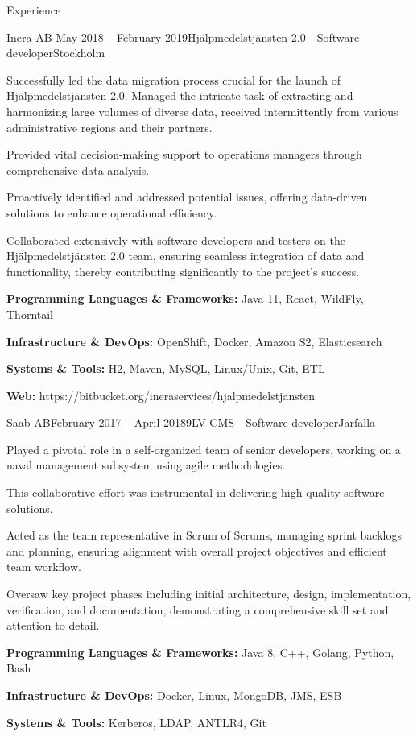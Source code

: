 \documentclass{resume}
\begin{document}
\begin{rSection}{Experience}
    \begin{rSubsection}{Inera AB }{May 2018 -- February 2019}{Hjälpmedelstjänsten 2.0 - Software developer}{Stockholm}
      \item Successfully led the data migration process crucial for the launch of Hjälpmedelstjänsten 2.0. Managed the intricate task of extracting and harmonizing large volumes of diverse data, received intermittently from various administrative regions and their partners.
      \item Provided vital decision-making support to operations managers through comprehensive data analysis.
      \item Proactively identified and addressed potential issues, offering data-driven solutions to enhance operational efficiency.
      \item Collaborated extensively with software developers and testers on the Hjälpmedelstjänsten 2.0 team, ensuring seamless integration of data and functionality, thereby contributing significantly to the project's success.
      \item \textbf{Programming Languages \& Frameworks:} Java 11, React, WildFly, Thorntail
      \item \textbf{Infrastructure \& DevOps:} OpenShift, Docker, Amazon S2, Elasticsearch
      \item \textbf{Systems \& Tools:} H2, Maven, MySQL, Linux/Unix, Git, ETL
      \item \textbf{Web:} https://bitbucket.org/ineraservices/hjalpmedelstjansten
    \end{rSubsection}

    \begin{rSubsection}{Saab AB}{February 2017 -- April 2018}{9LV CMS - Software developer}{Järfälla}
      \item Played a pivotal role in a self-organized team of senior developers, working on a naval management subsystem using agile methodologies.
      \item This collaborative effort was instrumental in delivering high-quality software solutions.
      \item Acted as the team representative in Scrum of Scrums, managing sprint backlogs and planning, ensuring alignment with overall project objectives and efficient team workflow.
      \item Oversaw key project phases including initial architecture, design, implementation, verification, and documentation, demonstrating a comprehensive skill set and attention to detail.
      \item \textbf{Programming Languages \& Frameworks:} Java 8, C++, Golang, Python, Bash
      \item \textbf{Infrastructure \& DevOps:} Docker, Linux, MongoDB, JMS, ESB
      \item \textbf{Systems \& Tools:} Kerberos, LDAP, ANTLR4, Git
    \end{rSubsection}


\end{rSection}
\end{document}
